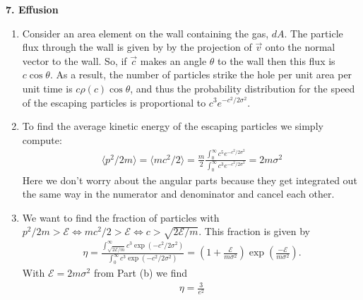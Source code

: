 \documentclass{article}
\theoremstyle{definition}
\newcommand{\f}[2]{\frac{#1}{#2}}
\newcommand{\lp}{\left(}
\newcommand{\rp}{\right)}
\begin{document}
\noindent \textbf{7. Effusion}
\begin{enumerate}[label=(\alph*)]
	\item Consider an area element on the wall containing the gas, $dA$. The particle flux through the wall is given by by the projection of $\vec{v}$ onto the normal vector to the wall. So, if $\vec{c}$ makes an angle $\theta$ to the wall then this flux is $c \cos\theta$. As a result, the number of particles strike the hole per unit area per unit time is $c\rho(c)\cos\theta$, and thus the probability  distribution for the speed of the escaping particles is proportional to $c^3 e^{-c^2/2\sigma^2}$. 
	 
	\item To find the average kinetic energy of the escaping particles we simply compute:
	\begin{align*}
	\langle p^2/2m \rangle = \langle  m c^2/2 \rangle  = \f{m}{2} \f{\int_0^\infty c^5 e^{-c^2/2\sigma^2}}{\int_0^\infty c^3 e^{-c^2/2\sigma^2}} = \boxed{2m\sigma^2}
 	\end{align*}
 	Here we don't worry about the angular parts because they get integrated out the same way in the numerator and denominator and cancel each other. 
 	
	\item We want to find the fraction of particles with $p^2/2m > \mathcal{E} \iff mc^2/2 > \mathcal{E} \iff c > \sqrt{2\mathcal{E}/m}$. This fraction is given by 
	\begin{align*}
	\eta = \f{\int_{\sqrt{2\mathcal{E}/m}}^\infty c^3 \exp(-c^2/2\sigma^2)}{\int_0^\infty c^3 \exp(-c^2/2\sigma^2)} = {\lp 1+ \f{\mathcal{E}}{m\sigma^2} \rp\exp\lp \f{-\mathcal{E}}{m\sigma^2} \rp}.
	\end{align*}
	With $\mathcal{E} = 2m\sigma^2$ from Part (b) we find 
	\begin{align*}
	\boxed{\eta = \f{3}{e^2}}
	\end{align*}
\end{enumerate}
\end{document}
